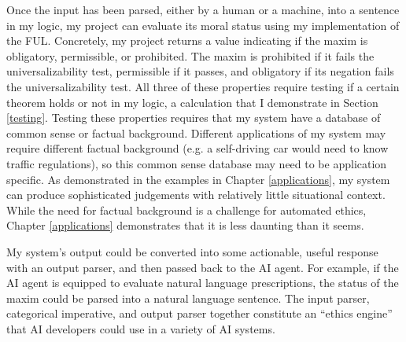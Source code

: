 \begin{isabellebody}
\begin{isamarkuptext}
Once the input has been parsed, either by a human or a machine, into  a sentence in my logic, my 
project can evaluate its moral status using my implementation of 
the FUL. Concretely, my project returns a value indicating if the maxim is obligatory, permissible, 
or prohibited. The maxim is prohibited if it fails the universalizability test, permissible if it passes, and obligatory 
if its negation fails the universalizability test. All three of these properties require testing if a 
certain theorem holds or not in my logic, a calculation that I demonstrate in Section \ref{testing}. 
Testing these properties requires that my system have a database of common sense or factual background. 
Different applications of my system may require different factual background (e.g. a self-driving car 
would need to know traffic regulations), so this common sense database may need to be application 
specific. As demonstrated in the examples in Chapter \ref{applications}, my system can produce sophisticated 
judgements with relatively little situational context. While the need for factual background is a challenge
for automated ethics, Chapter \ref{applications} demonstrates that it is less daunting than it seems. 

My system's output could be converted into some actionable, useful response with an output parser, 
and then passed back to the AI agent. For example, if the AI agent is equipped to evaluate natural 
language prescriptions, the status of the maxim could be parsed into a natural language sentence. The 
input parser, categorical imperative, and output parser together constitute an ``ethics engine'' 
that AI developers could use in a variety of AI systems.


\end{isamarkuptext}
\end{isabellebody}
